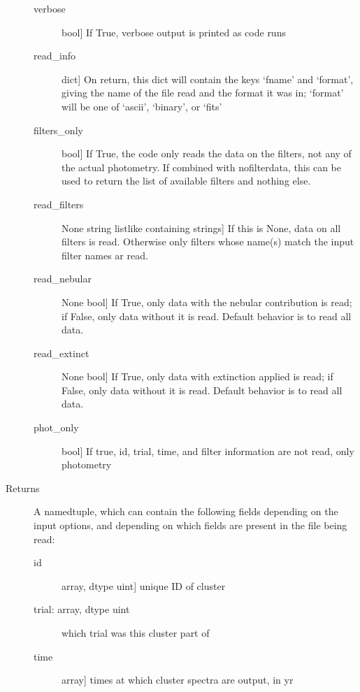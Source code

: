 \documentclass[letterpaper,10pt,english]{sphinxmanual}
\begin{document}
\begin{fulllineitems}
\begin{description}
\begin{description}
\item[{verbose}] \leavevmode{[}bool{]}
If True, verbose output is printed as code runs

\item[{read\_info}] \leavevmode{[}dict{]}
On return, this dict will contain the keys `fname' and
`format', giving the name of the file read and the format it
was in; `format' will be one of `ascii', `binary', or `fits'

\item[{filters\_only}] \leavevmode{[}bool{]}
If True, the code only reads the data on the filters, not
any of the actual photometry. If combined with nofilterdata,
this can be used to return the list of available filters
and nothing else.

\item[{read\_filters}] \leavevmode{[}None \textbar{} string \textbar{} listlike containing strings{]}
If this is None, data on all filters is read. Otherwise only
filters whose name(s) match the input filter names ar
read.

\item[{read\_nebular}] \leavevmode{[}None \textbar{} bool{]}
If True, only data with the nebular contribution is read; if
False, only data without it is read. Default behavior is to
read all data.

\item[{read\_extinct}] \leavevmode{[}None \textbar{} bool{]}
If True, only data with extinction applied is read; if
False, only data without it is read. Default behavior is to
read all data.

\item[{phot\_only}] \leavevmode{[}bool{]}
If true, id, trial, time, and filter information are not
read, only photometry

\end{description}

\item[{Returns}] \leavevmode
A namedtuple, which can contain the following fields depending
on the input options, and depending on which fields are present
in the file being read:
\begin{description}
\item[{id}] \leavevmode{[}array, dtype uint{]}
unique ID of cluster

\item[{trial: array, dtype uint}] \leavevmode
which trial was this cluster part of

\item[{time}] \leavevmode{[}array{]}
times at which cluster spectra are output, in yr


\end{description}
\end{description}
\end{fulllineitems}
\end{document}

